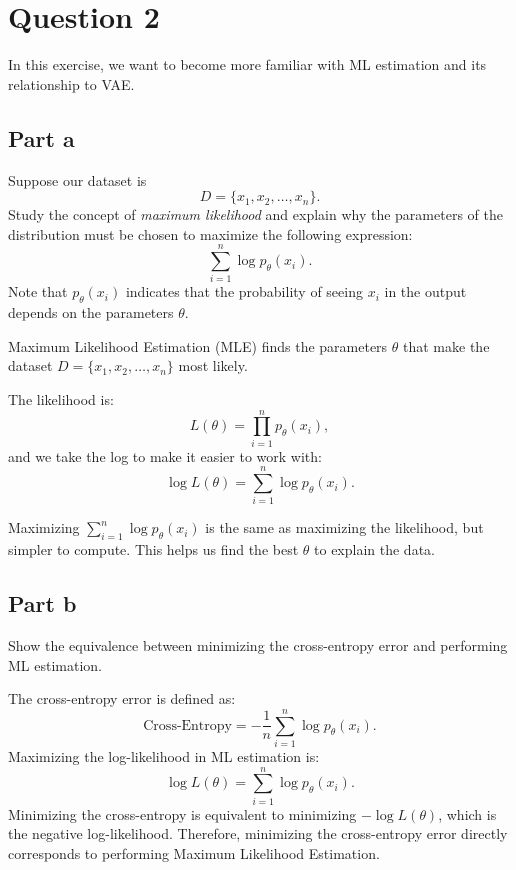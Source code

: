 \section{Question 2}
In this exercise, we want to become more familiar with ML estimation and its relationship to VAE.
\subsection{Part a}
Suppose our dataset is 
\[
D = \{ x_1, x_2, \ldots, x_n \}.
\]
Study the concept of \emph{maximum likelihood} and explain why the parameters of the distribution 
must be chosen to maximize the following expression:
\[
\sum_{i=1}^{n} \log p_{\theta}(x_i).
\]
Note that \(p_{\theta}(x_i)\) indicates that the probability of seeing \(x_i\) in the output 
depends on the parameters \(\theta\).
\begin{qsolve}
    \begin{qsolve}[]
        Maximum Likelihood Estimation (MLE) finds the parameters \(\theta\) that make the dataset \(D = \{x_1, x_2, \ldots, x_n\}\) most likely. 

        The likelihood is:
        \[
        L(\theta) = \prod_{i=1}^{n} p_{\theta}(x_i),
        \]
        and we take the log to make it easier to work with:
        \[
        \log L(\theta) = \sum_{i=1}^{n} \log p_{\theta}(x_i).
        \]

        Maximizing \(\sum_{i=1}^{n} \log p_{\theta}(x_i)\) is the same as maximizing the likelihood, but simpler to compute. This helps us find the best \(\theta\) to explain the data.
    \end{qsolve}
\end{qsolve}
\subsection{Part b}
Show the equivalence between minimizing the cross-entropy error and performing ML estimation.
\begin{qsolve}
    \begin{qsolve}[]
        The cross-entropy error is defined as:
        \[
        \text{Cross-Entropy} = -\frac{1}{n} \sum_{i=1}^{n} \log p_{\theta}(x_i).
        \]
        \splitqsolve[\splitqsolve]
        Maximizing the log-likelihood in ML estimation is:
        \[
        \log L(\theta) = \sum_{i=1}^{n} \log p_{\theta}(x_i).
        \]
        Minimizing the cross-entropy is equivalent to minimizing \(-\log L(\theta)\), which is the negative log-likelihood. Therefore, minimizing the cross-entropy error directly corresponds to performing Maximum Likelihood Estimation.    \end{qsolve}
\end{qsolve}
